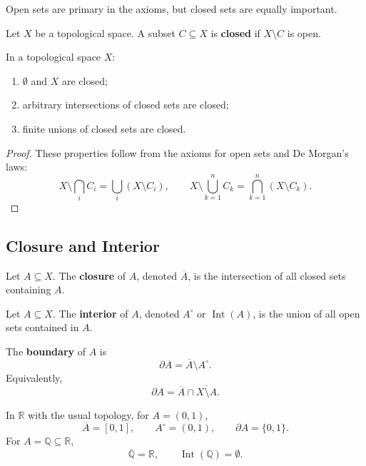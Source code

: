 Open sets are primary in the axioms, but closed sets are equally important.

\begin{definition}
Let $X$ be a topological space. A subset $C\subseteq X$ is \textbf{closed} if $X\setminus C$ is open.
\end{definition}

\begin{proposition}
In a topological space $X$:
\begin{enumerate}
    \item $\emptyset$ and $X$ are closed;
    \item arbitrary intersections of closed sets are closed;
    \item finite unions of closed sets are closed.
\end{enumerate}
\end{proposition}

\begin{proof}
These properties follow from the axioms for open sets and De Morgan's laws:
\[
    X\setminus\bigcap_i C_i=\bigcup_i(X\setminus C_i),
    \qquad
    X\setminus\bigcup_{k=1}^n C_k=\bigcap_{k=1}^n(X\setminus C_k).
\]
\end{proof}

\subsection{Closure and Interior}

\begin{definition}[Closure]
Let $A\subseteq X$. The \textbf{closure} of $A$, denoted $\overline{A}$, is the intersection of all closed sets containing $A$.
\end{definition}

\begin{definition}[Interior]
Let $A\subseteq X$. The \textbf{interior} of $A$, denoted $A^\circ$ or $\operatorname{Int}(A)$, is the union of all open sets contained in $A$.
\end{definition}

\begin{definition}[Boundary]
The \textbf{boundary} of $A$ is
\[
    \partial A=\overline{A}\setminus A^\circ.
\]
Equivalently,
\[
    \partial A=\overline{A}\cap\overline{X\setminus A}.
\]
\end{definition}



\begin{example}
In $\mathbb{R}$ with the usual topology, for $A=(0,1)$,
\[
    \overline{A}=[0,1],
    \qquad
    A^\circ=(0,1),
    \qquad
    \partial A=\{0,1\}.
\]
For $A=\mathbb{Q}\subseteq\mathbb{R}$,
\[
    \overline{\mathbb{Q}}=\mathbb{R},
    \qquad
    \operatorname{Int}(\mathbb{Q})=\emptyset.
\]
\end{example}

